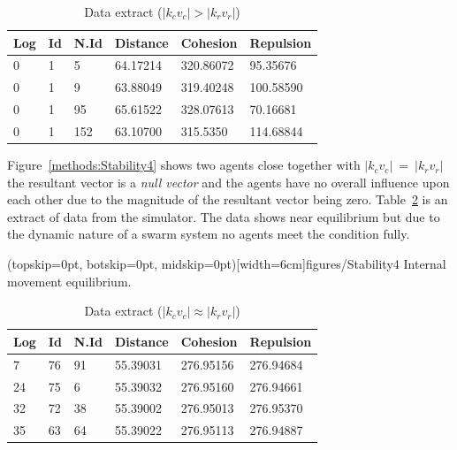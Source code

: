 \documentclass{ieeeaccess}
\begin{document}
\begin{table}[H]
\begin{center}
\begin{tabular}{| l | l | l | l | l | l |}
\hline
Log &	Id &	N.Id &	Distance &	{\color{green}Cohesion} & {\color{red}Repulsion} 	\\ \hline
0 & 1 & 5 &	64.17214 &	{\color{green}320.86072} &	{\color{red}95.35676} \\ \hline
0 & 1 & 9 &	63.88049 &	{\color{green}319.40248} &	{\color{red}100.58590} \\ \hline
0 & 1 & 95 & 65.61522 &	{\color{green}328.07613} &	{\color{red}70.16681} \\ \hline
0 & 1 & 152 & 63.10700 & {\color{green}315.5350} & {\color{red}114.68844} \\ 
\hline
\end{tabular}\caption{Data extract ($|k_cv_c| > |k_rv_r|$)} \label{tab:SampleCohesionPositive}
\end{center}
\end{table}

Figure~\ref{methods:Stability4} shows two agents close together with $|k_cv_c|~=~|k_rv_r|$ the resultant vector is a \textit{null vector} and the agents have no overall influence upon each other due to the magnitude of the resultant vector being zero. Table~\ref{tab:SampleEquilibrium} is an extract of data from the simulator. The data shows near equilibrium but due to the dynamic nature of a swarm system no agents meet the condition fully. 

\Figure[t!](topskip=0pt, botskip=0pt, midskip=0pt)[width=6cm]{figures/Stability4}
{Internal movement equilibrium.\label{methods:Stability4}}


\begin{table}[H]
\begin{center}
\begin{tabular}{| l | l | l | l | l | l |}
\hline
Log &	Id &	N.Id &	Distance &	{\color{green}Cohesion} &	{\color{red}Repulsion} 	\\ \hline
7 & 76 &	91 & 55.39031 & {\color{green}276.95156} & {\color{red}276.94684} \\ \hline
24 & 75 & 6 & 55.39032 & {\color{green}276.95160} & {\color{red}276.94661} \\ \hline
32 & 72 & 38 &	55.39002 & {\color{green}276.95013} & {\color{red}276.95370} \\ \hline
35 & 63 & 64 & 55.39022 &	{\color{green}276.95113} &	{\color{red}276.94887} \\
\hline
\end{tabular}\caption{Data extract ($|k_cv_c| \approx |k_rv_r|$)} \label{tab:SampleEquilibrium}
\end{center}
\end{table} 
\end{document}
